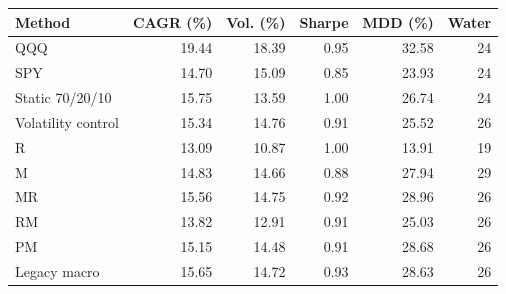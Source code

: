 \begin{tabular}{@{}lrrrrr@{}}\toprule
Method & CAGR (\%) & Vol. (\%) & Sharpe & MDD (\%) & Water\\\midrule
QQQ & 19.44 & 18.39 & 0.95 & 32.58 & 24\\
SPY & 14.70 & 15.09 & 0.85 & 23.93 & 24\\
Static 70/20/10 & 15.75 & 13.59 & 1.00 & 26.74 & 24\\
Volatility control & 15.34 & 14.76 & 0.91 & 25.52 & 26\\
R & 13.09 & 10.87 & 1.00 & 13.91 & 19\\
M & 14.83 & 14.66 & 0.88 & 27.94 & 29\\
MR & 15.56 & 14.75 & 0.92 & 28.96 & 26\\
RM & 13.82 & 12.91 & 0.91 & 25.03 & 26\\
PM & 15.15 & 14.48 & 0.91 & 28.68 & 26\\
Legacy macro & 15.65 & 14.72 & 0.93 & 28.63 & 26\\
\bottomrule
\end{tabular}
